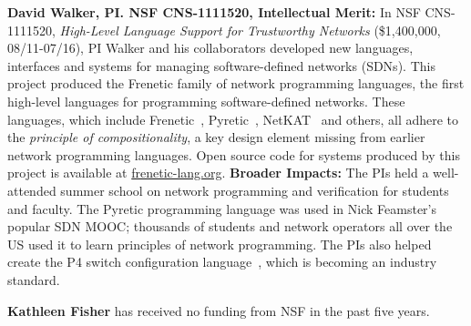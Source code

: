 \noindent
{\bf David Walker, PI. NSF CNS-1111520, Intellectual Merit:}
In NSF CNS-1111520, \emph{High-Level Language Support for Trustworthy Networks}
(\$1,400,000, 08/11-07/16),
PI Walker and his collaborators developed new languages, interfaces
and systems for managing software-defined networks (SDNs).  
This project produced the Frenetic family
of network programming languages, the first high-level languages for
programming software-defined networks.  These languages, which include
Frenetic~\cite{frenetic}, 
Pyretic~\cite{pyretic},
NetKAT~\cite{netkat} and others, all adhere to the
\emph{principle of compositionality}, a key design element missing
from earlier network programming languages.  
Open source code for systems produced by this project is available
at \url{frenetic-lang.org}.
%
{\bf Broader Impacts:} 
The PIs held a well-attended summer school on network programming and 
verification for students and faculty. The
Pyretic programming language was used in Nick Feamster's popular
SDN MOOC; thousands of students and
network operators all over the US used it to learn principles of network
programming.  The PIs
also helped create the P4 switch configuration language~\cite{P4}, which is
becoming an industry standard.

\medskip
\noindent
{\bf Kathleen Fisher} has received no funding from NSF in the past
five years.



